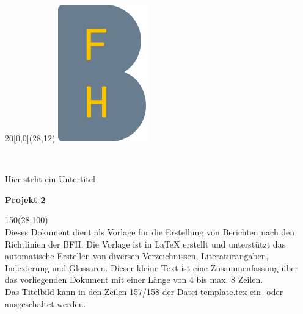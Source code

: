 %
%

\begin{titlepage}


\setlength{\unitlength}{1mm}
\begin{textblock}{20}[0,0](28,12)
	\includegraphics[scale=1.0]{bilder/BFH_Logo_B.png}
\end{textblock}
\color{black}

\begin{flushleft}

\vspace*{21mm}

\fontsize{26pt}{40pt}\selectfont 
\titel 				\\							%
\vspace{2mm}

\fontsize{16pt}{24pt}\selectfont\vspace{0.3em}
Hier steht ein Untertitel 			\\							%
\vspace{5mm}

\fontsize{10pt}{12pt}\selectfont
\textbf{Projekt 2} \\									%
\vspace{7mm}

\begin{textblock}{150}(28,100)
\fontsize{10pt}{12pt} \\ 
Dieses Dokument dient als Vorlage für die Erstellung von Berichten nach den Richtlinien der BFH. Die Vorlage ist in \LaTeX{} erstellt und unterstützt das automatische Erstellen von diversen Verzeichnissen, Literaturangaben, Indexierung und Glossaren. Dieser kleine Text ist eine Zusammenfassung über das vorliegenden Dokument mit einer Länge von 4 bis max. 8 Zeilen. \\
Das Titelbild kann in den Zeilen 157/158 der Datei template.tex ein- oder ausgeschaltet werden.
\end{textblock}


\end{flushleft}
\end{titlepage}
